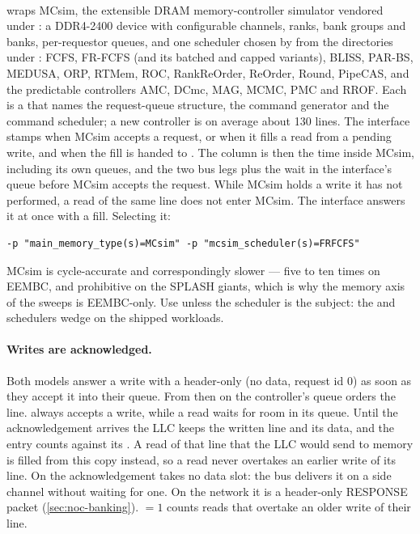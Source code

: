 \paragraph{} wraps MCsim, the extensible DRAM memory-controller simulator
vendored under : a DDR4-2400 device with configurable channels, ranks, bank
groups and banks, per-requestor queues, and one scheduler chosen by  from
the directories under : FCFS, FR-FCFS (and its batched and capped
variants), BLISS, PAR-BS, MEDUSA, ORP, RTMem, ROC, RankReOrder, ReOrder, Round, PipeCAS, and the
predictable controllers AMC, DCmc, MAG, MCMC, PMC and RROF. Each is a  that
names the request-queue structure, the command generator and the command scheduler; a new
controller is on average about 130 lines. The interface stamps  when MCsim
accepts a request, or when it fills a read from a pending write, and  when the
fill is handed to . The  column is then the time inside MCsim, including
its own queues, and  the two bus legs plus the wait in the interface's queue
before MCsim accepts the request.
While MCsim holds a write it has not performed, a read of the same line does not enter MCsim. The
interface answers it at once with a fill. Selecting it:

\begin{lstlisting}[style=shell]
-p "main_memory_type(s)=MCsim" -p "mcsim_scheduler(s)=FRFCFS"
\end{lstlisting}

MCsim is cycle-accurate and correspondingly slower --- five to ten times on EEMBC, and
prohibitive on the SPLASH giants, which is why the memory axis of the sweeps is EEMBC-only. Use
 unless the scheduler is the subject: the  and  schedulers
wedge on the shipped workloads.

\paragraph{Writes are acknowledged.} Both models answer a write with a header-only
 (no data, request id 0) as soon as they accept it into their queue. From then on
the controller's queue orders the line.  always accepts a write, while
a read waits for room in its queue. Until the acknowledgement arrives the LLC keeps the written line
and its data, and the entry counts against its . A read of that line that the LLC
would send to memory is filled from this copy instead, so a read never overtakes an earlier write of
its line. On  the acknowledgement takes no data slot: the bus delivers it on a side
channel without waiting for one. On the network it is a header-only RESPONSE packet
(\cref{sec:noc-banking}). $=1$ counts reads that overtake an older
write of their line.

